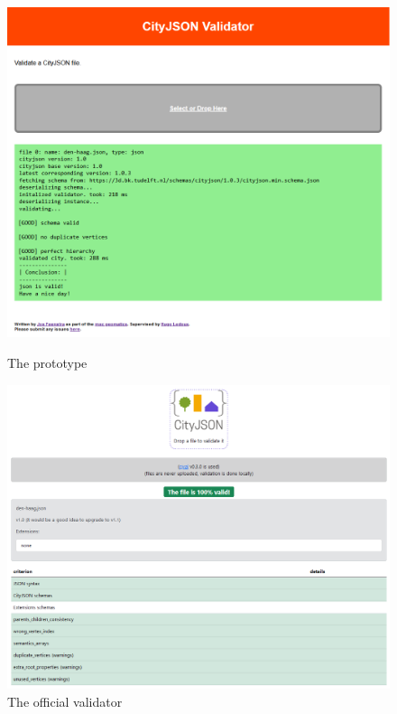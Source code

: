 \begin{figure}[!tbp]
    \centering
    \begin{minipage}[b]{0.45\textwidth}
      \includegraphics[width=\textwidth]{../images/cjval-prototype.PNG}
      \caption{The prototype}
      \label{fig:cjval-prototype}
    \end{minipage}
    \hfill
    \begin{minipage}[b]{0.45\textwidth}
      \includegraphics[width=\textwidth]{../images/cjval-official.PNG}
      \caption{The official validator}
      \label{fig:cjval-official}
    \end{minipage}
\end{figure}



